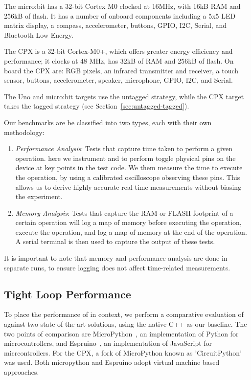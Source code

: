 The micro:bit has a 32-bit Cortex M0 clocked at 16MHz, with 16kB RAM and 256kB of flash. It has a number of onboard components 
including a 5x5 LED matrix display, a compass, accelerometer, buttons, GPIO, I2C, Serial, and Bluetooth Low Energy.

The CPX is a 32-bit Cortex-M0+, which offers greater energy efficiency and performance; it clocks at 48 MHz, has 32kB of RAM and 
256kB of flash. On board the CPX are: RGB pixels, an infrared transmitter and receiver, a touch sensor, buttons, accelerometer, speaker, 
microphone, GPIO, I2C, and Serial.

The Uno and micro:bit \MC targets use the untagged strategy, while the CPX target takes the tagged strategy (see Section~\ref{sec:untagged-tagged}).

Our benchmarks are be classified into two types, each with their own methodology:

\begin{enumerate}
    \item \textit{Performance Analysis}: Tests that capture time taken to perform a given operation. here we instrument
    \MC and \CO to perform toggle physical pins on the device at key points in the test code. We them measure the time to
   execute the operation, by using a calibrated oscilloscope observing these pins. This allows us to derive highly accurate real time 
   measurements without biasing the experiment.

    \item \textit{Memory Analysis}: Tests that capture the RAM or FLASH footprint of a certain operation will log a map of memory 
    before executing the operation, execute the operation, and log a map of memory at the end of the operation. 
    A serial terminal is then used to capture the output of these tests.
\end{enumerate}

It is important to note that memory and performance analysis are done in separate runs, 
to ensure logging does not affect time-related measurements.

\subsection{Tight Loop Performance}

To place the performance of \MC in context, we perform a comparative evaluation of \MC against two state-of-the-art 
solutions, using the native C++ as our baseline. The two points of comparison are MicroPython~\cite{MicroPython}, an implementation 
of Python for microcontrollers, and Espruino~\cite{espruinoBook}, an implementation of JavaScript for micrcontrollers. 
For the CPX, a fork of MicroPython known as 'CircuitPython' was used. Both micropython and Espruino adopt virtual machine based
approaches.

